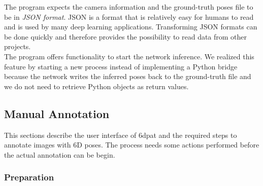 The program expects the camera information and the ground-truth poses file to be in \textit{JSON format}. JSON is a format that is relatively easy for humans to read and is used by many deep learning applications. Transforming JSON formats can be done quickly and therefore provides the possibility to read data from other projects. \\

The program offers functionality to start the network inference. We realized this feature by starting a new process instead of implementing a Python bridge because the network writes the inferred poses back to the ground-truth file and we do not need to retrieve Python objects as return values.

\subsection{Manual Annotation} 

This sections describe the user interface of \gls{6dpat} and the required steps to annotate images with 6D poses. The process needs some actions performed before the actual annotation can be begin. 

\subsubsection{Preparation}

